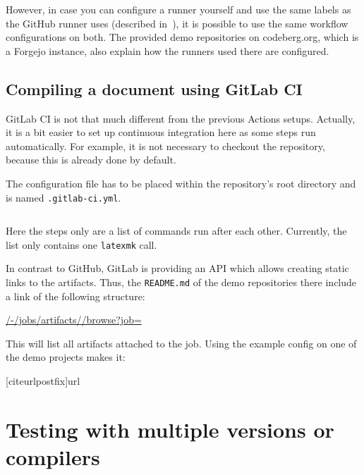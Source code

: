 \documentclass[final]{ltugboat}
\newcommand*{\setListingIcon}[1]{\def\listingIcon{#1}}
\newcommand*{\command}[1]{\texttt{#1}}
\newcommand*{\file}[1]{\texttt{#1}}
\begin{document}
However, in case you can configure a runner yourself and use the same labels as the GitHub runner uses (described in~\cite{forgejo-runner-config}), it is possible to use the same workflow configurations on both.
The provided demo repositories on codeberg.org, which is a Forgejo instance, also explain how the runners used there are configured.

\subsection{Compiling a document using GitLab CI}
\setListingIcon{\GitLab}

GitLab CI is not that much different from the previous Actions setups.
Actually, it is a bit easier to set up continuous integration here as some steps run automatically.
For example, it is not necessary to checkout the repository, because this is already done by default.

The configuration file has to be placed within the repository's root directory and is named \file{.gitlab-ci.yml}.

\inputminted[breaklines,breakafter=/]{yaml}{examples/latex-basic-gitlab.yml}

Here the steps only are a list of commands run after each other. Currently, the list only contains one \command{latexmk} call.

In contrast to GitHub, GitLab is providing an API which allows creating static links to the artifacts.
Thus, the \file{README.md} of the demo repositories there include a link of the following structure:

\begin{FlushLeft}
\url{/-/jobs/artifacts/}\allowbreak\url{/browse?job=}
\end{FlushLeft}

This will list all artifacts attached to the job.
Using the example config on one of the demo projects makes it:

\begin{FlushLeft}
{[citeurlpostfix]{url}}
\end{FlushLeft}

\section{Testing with multiple versions or compilers}
\setListingIcon{\GitHub}
\end{document}
